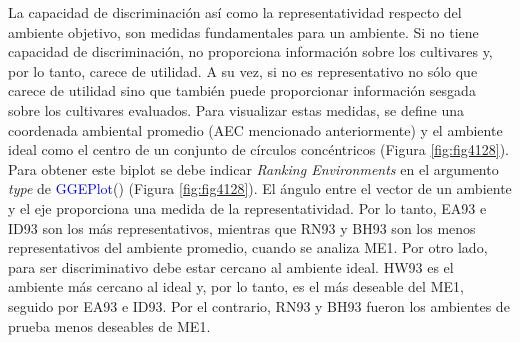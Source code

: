 La capacidad de discriminación así como la representatividad respecto del ambiente objetivo, son medidas fundamentales para un ambiente. Si no tiene capacidad de discriminación, no proporciona información sobre los cultivares y, por lo tanto, carece de utilidad. A su vez, si no es representativo no sólo que carece de utilidad sino que también puede proporcionar información sesgada sobre los cultivares evaluados. Para visualizar estas medidas, se define una coordenada ambiental promedio (AEC mencionado anteriormente) y el ambiente ideal como el centro de un conjunto de círculos concéntricos (Figura \ref{fig:fig4128}). Para obtener este biplot se debe indicar \emph{Ranking Environments} en el argumento \emph{type} de \textcolor{blue}{GGEPlot}() (Figura \ref{fig:fig4128}). El ángulo entre el vector de un ambiente y el eje proporciona una medida de la representatividad. Por lo tanto, EA93 e ID93 son los más representativos, mientras que RN93 y BH93 son los menos representativos del ambiente promedio, cuando se analiza ME1. Por otro lado, para ser discriminativo debe estar cercano al ambiente ideal. HW93 es el ambiente más cercano al ideal y, por lo tanto, es el más deseable del ME1, seguido por EA93 e ID93. Por el contrario, RN93 y BH93 fueron los ambientes de prueba menos deseables de ME1. 



